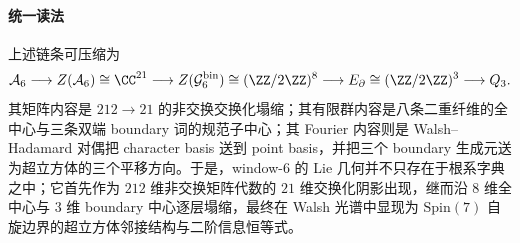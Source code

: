 \paragraph{统一读法}
上述链条可压缩为
\[
\mathcal A_6
\longrightarrow
Z(\mathcal A_6)\cong \CC^{21}
\longrightarrow
Z(\mathcal G_6^{\mathrm{bin}})\cong (\ZZ/2\ZZ)^8
\longrightarrow
E_{\partial}\cong (\ZZ/2\ZZ)^3
\longrightarrow
Q_3.
\]
其矩阵内容是 \(212\to 21\) 的非交换交换化塌缩；其有限群内容是八条二重纤维的全中心与三条双端 boundary 词的规范子中心；其 Fourier 内容则是 Walsh--Hadamard 对偶把 character basis 送到 point basis，并把三个 boundary 生成元送为超立方体的三个平移方向。于是，window-\(6\) 的 Lie 几何并不只存在于根系字典之中；它首先作为 \(212\) 维非交换矩阵代数的 \(21\) 维交换化阴影出现，继而沿 \(8\) 维全中心与 \(3\) 维 boundary 中心逐层塌缩，最终在 Walsh 光谱中显现为 \(\mathrm{Spin}(7)\) 自旋边界的超立方体邻接结构与二阶信息恒等式。

\endinput
